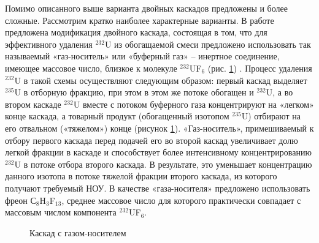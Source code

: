 Помимо описанного выше варианта двойных каскадов предложены и более сложные. Рассмотрим кратко наиболее характерные варианты.
В работе \cite{prusakovKorrekciyaIzotopnogoSostava2008} предложена модификация двойного каскада, состоящая в том, что для эффективного удаления $^{232}$U из обогащаемой смеси предложено использовать так называемый «газ-носитель» или «буферный газ» – инертное соединение, имеющее массовое число, близкое к молекуле $^{232}$UF$_{6}$ (рис. \ref{p2_gas}) \cite{orlovWayObtainUranium2015, orlovDesublimationPurificationTransporting2017}. Процесс удаления $^{232}$U в такой схемы осуществляют следующим образом: первый каскад выделяет $^{235}$U в отборную фракцию, при этом в этом же потоке обогащен и $^{232}$U, а во втором каскаде $^{232}$U вместе с потоком буферного газа концентрируют на «легком» конце каскада, а товарный продукт (обогащенный изотопом $^{235}$U) отбирают на его отвальном («тяжелом») конце (рисунок \ref{p2_gas}). «Газ-носитель», примешиваемый к отбору первого каскада перед подачей его во второй каскад  увеличивает долю легкой фракции в каскаде и способствует более интенсивному концентрированию $^{232}$U в потоке отбора второго каскада. В результате, это уменьшает концентрацию данного изотопа в потоке тяжелой фракции второго каскада, из которого получают требуемый НОУ. В качестве «газа-носителя» предложено использовать фреон С$_{8}$H$_{3}$F$_{13}$, среднее массовое число для которого практически совпадает с массовым числом компонента $^{232}$UF$_{6}$.


\begin{figure}[ht]
  \caption{Каскад с газом-носителем}\label{p2_gas}
\end{figure}
 

